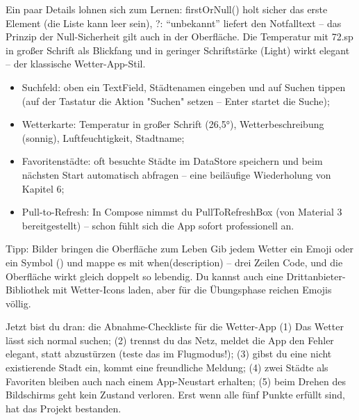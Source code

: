 Ein paar Details lohnen sich zum Lernen: firstOrNull() holt sicher das erste Element (die Liste kann leer sein), ?: “unbekannt” liefert den Notfalltext – das Prinzip der Null-Sicherheit gilt auch in der Oberfläche. Die Temperatur mit 72.sp in großer Schrift als Blickfang und in geringer Schriftstärke (Light) wirkt elegant – der klassische Wetter-App-Stil.



\begin{itemize}
  \item Suchfeld: oben ein TextField, Städtenamen eingeben und auf Suchen tippen (auf der Tastatur die Aktion "Suchen" setzen – Enter startet die Suche);
  \item Wetterkarte: Temperatur in großer Schrift (26,5°), Wetterbeschreibung (sonnig), Luftfeuchtigkeit, Stadtname;
  \item Favoritenstädte: oft besuchte Städte im DataStore speichern und beim nächsten Start automatisch abfragen – eine beiläufige Wiederholung von Kapitel 6;
  \item Pull-to-Refresh: In Compose nimmst du PullToRefreshBox (von Material 3 bereitgestellt) – schon fühlt sich die App sofort professionell an.
\end{itemize}

\begin{tcbinfo}{Tipp: Bilder bringen die Oberfläche zum Leben}
Gib jedem Wetter ein Emoji oder ein Symbol () und mappe es mit when(description) – drei Zeilen Code, und die Oberfläche wirkt gleich doppelt so lebendig. Du kannst auch eine Drittanbieter-Bibliothek mit Wetter-Icons laden, aber für die Übungsphase reichen Emojis völlig.

\end{tcbinfo}

\begin{tcbpractice}{Jetzt bist du dran: die Abnahme-Checkliste für die Wetter-App}
(1) Das Wetter lässt sich normal suchen; (2) trennst du das Netz, meldet die App den Fehler elegant, statt abzustürzen (teste das im Flugmodus!); (3) gibst du eine nicht existierende Stadt ein, kommt eine freundliche Meldung; (4) zwei Städte als Favoriten bleiben auch nach einem App-Neustart erhalten; (5) beim Drehen des Bildschirms geht kein Zustand verloren. Erst wenn alle fünf Punkte erfüllt sind, hat das Projekt bestanden.

\end{tcbpractice}

